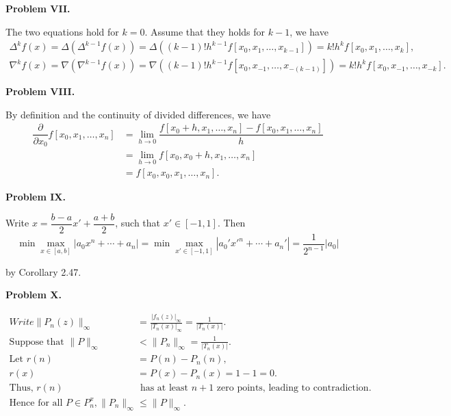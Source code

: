 \documentclass[UTF8]{ctexart}
\begin{document}
\quad

\textbf{Problem VII.}

The two equations hold for $k=0$. Assume that they holds for $k-1$, we have
\[\begin{aligned}
    \Delta^k f(x)=\Delta(\Delta^{k-1} f(x))=\Delta((k-1)!h^{k-1}f[x_0,x_1,\dots,x_{k-1}])=k!h^kf[x_0,x_1,\dots,x_k],\\
    \nabla^k f(x)=\nabla(\nabla^{k-1} f(x))=\nabla((k-1)!h^{k-1}f[x_0,x_{-1},\dots,x_{-(k-1)}])=k!h^kf[x_0,x_{-1},\dots,x_{-k}].
\end{aligned}\]

\quad

\textbf{Problem VIII.}

By definition and the continuity of divided differences, we have
\[\begin{aligned}
    \dfrac{\partial}{\partial x_0}f[x_0,x_1,\dots,x_n]&=\lim_{h\to 0}\dfrac{f[x_0+h,x_1,\dots,x_n]-f[x_0,x_1,\dots,x_n]}{h}\\&=\lim_{h\to 0}f[x_0,x_0+h,x_1,\dots,x_n]
    \\&=f[x_0,x_0,x_1,\dots,x_n].
\end{aligned}\]

\quad

\textbf{Problem IX.}

Write $x=\dfrac{b-a}{2}x'+\dfrac{a+b}{2}$, such that $x'\in[-1,1]$. Then
\[\min\max_{x\in[a,b]}|a_0x^n+\cdots+a_n|=\min\max_{x'\in[-1,1]}|a_0'x'^n+\cdots+a_n'|=\dfrac{1}{2^{n-1}}|a_0|\]

by Corollary 2.47.

\quad

\textbf{Problem X.}

\begin{align*}
    Write \| P_n(z) \|_\infty &= \frac{|f_n(z)|_\infty}{|T_n(x)|_\infty} = \frac{1}{|T_n(x)|}. \\
    \text{Suppose that } \|P\|_\infty &< \|P_n\|_\infty = \frac{1}{|T_n(x)|}. \\
    \text{Let } r(n) &= P(n) - P_n(n), \\
    r(x) &= P(x) - P_n(x) = 1 - 1 = 0. \\
    \text{Thus, } r(n) &\text{ has at least } n+1 \text{ zero points, leading to contradiction.} \\
    \text{Hence for all } P \in P^x_n, \|P_n\|_\infty &\leq \|P\|_\infty.
\end{align*}
    
\end{document}
